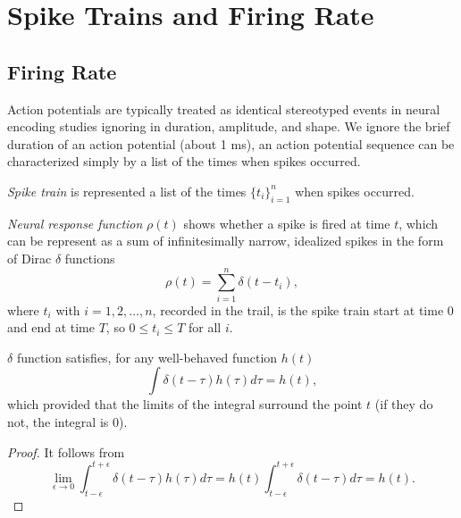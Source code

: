 
\section{Spike Trains and Firing Rate}
\label{sec:firing rate}

\subsection{Firing Rate}

\begin{asm}
  Action potentials are typically treated as identical 
  stereotyped events in neural encoding
  studies ignoring in duration, amplitude, and shape. 
  We ignore the brief duration of an action potential (about 1 ms),
  an action potential sequence can be characterized simply by a list of the
  times when spikes occurred.
\end{asm} 

\begin{ntn}
  \emph{Spike train} is represented a list of the times $\{t_i\}_{i=1}^n$ when spikes occurred.
\end{ntn}

\begin{defn}
  \emph{Neural response function} $\rho (t)$ shows whether a spike is fired at time $t$,
   which can be represent as a sum of infinitesimally narrow, 
  idealized spikes in the form of Dirac $\delta$ functions
  \begin{equation}
    \label{equ:1.1}
    \rho(t)=\sum_{i=1}^n\delta(t-t_i),
  \end{equation}
  where $t_i$ with $i=1,2,\dots,n$, recorded in the trail, is the spike train
   start at time $0$ and end at time $T$, so $0\leq t_i\leq T$ for all $i$.
\end{defn}

\begin{lem}
  $\delta$ function satisfies, for any well-behaved function $h(t)$
  \begin{equation}
    \label{equ:1.3}
    \int \delta(t-\tau)h(\tau)d\tau=h(t),
  \end{equation}
  which provided that the limits of the integral surround the point $t$ (if they do not,
  the integral is $0$).
  \begin{proof}
  It follows from
  \begin{equation*}
    \lim_{\epsilon\rightarrow 0}\int_{t - \epsilon}^{t + \epsilon} \delta(t-\tau)h(\tau)d\tau
    =h(t)\int_{t - \epsilon}^{t + \epsilon} \delta(t-\tau)d\tau=h(t).
  \end{equation*}
  \end{proof}

\end{lem}

